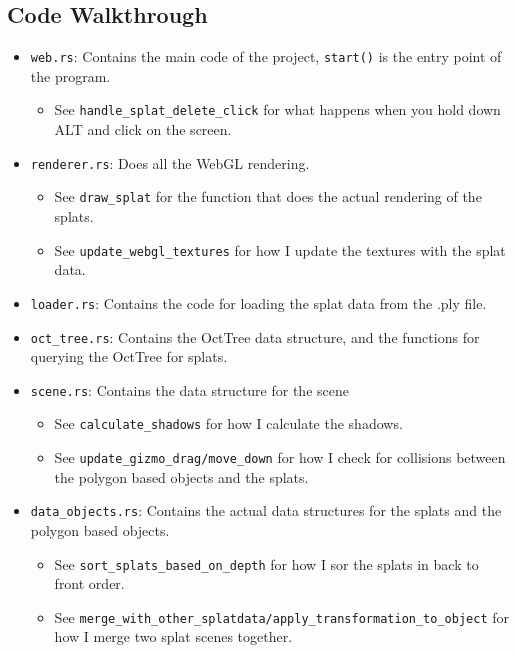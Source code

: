 \documentclass {article}
\begin{document}
\subsection{Code Walkthrough}

\begin{itemize}
\item \lstinline[style=inlinecode]{web.rs}: Contains the main code of the project, \lstinline[style=inlinecode]{start()} is the entry point of the program.
    \begin{itemize}
        \item See \lstinline[style=inlinecode]{handle_splat_delete_click} for what happens when you hold down ALT and click on the screen.
    \end{itemize}
\item \lstinline[style=inlinecode]{renderer.rs}: Does all the WebGL rendering. 
    \begin{itemize}
        \item See \lstinline[style=inlinecode]{draw_splat} for the function that does the actual rendering of the splats.
        \item See \lstinline[style=inlinecode]{update_webgl_textures} for how I update the textures with the splat data.
    \end{itemize}
\item \lstinline[style=inlinecode]{loader.rs}: Contains the code for loading the splat data from the .ply file.
\item \lstinline[style=inlinecode]{oct_tree.rs}: Contains the OctTree data structure, and the functions for querying the OctTree for splats.
\item \lstinline[style=inlinecode]{scene.rs}: Contains the data structure for the scene
    \begin{itemize}
        \item See \lstinline[style=inlinecode]{calculate_shadows} for how I calculate the shadows.
        \item See \lstinline[style=inlinecode]{update_gizmo_drag/move_down} for how I check for collisions between the polygon based objects and the splats.
    \end{itemize}

\item \lstinline[style=inlinecode]{data_objects.rs}: Contains the actual data structures for the splats and the polygon based objects.
    \begin{itemize}
        \item See \lstinline[style=inlinecode]{sort_splats_based_on_depth} for how I sor the splats in back to front order.
        \item See \lstinline[style=inlinecode]{merge_with_other_splatdata/apply_transformation_to_object} for how I merge two splat scenes together.
    \end{itemize}
\end{itemize}
\end{document}
